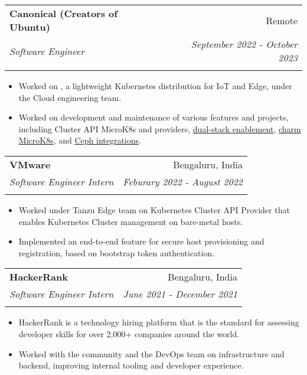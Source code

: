 \documentclass[letterpaper,10pt]{article}
\makeatletter
\newcommand{\resumeItem}[2]{
  \item\small{
    \textbf{#1}{#2 \vspace{-2pt}}
  }
}
\newcommand{\resumeSubheading}[5]{
  \vspace{4pt}\item
    \begin{tabular*}{0.97\textwidth}[t]{l@{\extracolsep{\fill}}r}
      \textbf{#1} & #2 \\
      \textit{\small#3} & \textit{\small #4} \\
      \textit{\small#5}
    \end{tabular*}\vspace{-5pt}
}
\newcommand{\resumeItemListStart}{\begin{itemize}}
\newcommand{\resumeItemListEnd}{\end{itemize}\vspace{-5pt}}
\makeatother
\begin{document}
    \resumeSubheading
    {Canonical (Creators of Ubuntu)}{Remote}
    {Software Engineer} {September 2022 - October 2023}
    {\href{https://canonical.com/}{\color{MidnightBlue}{https://canonical.com/}}}
    \resumeItemListStart
    \resumeItem{}
    {Worked on \href{https://microk8s.io/}{\color{MidnightBlue}{MicroK8s}}, a lightweight Kubernetes distribution for IoT and Edge, under the Cloud engineering team.}
    \resumeItem{}
    {Worked on development and maintenance of various features and projects, including Cluster API MicroK8s \href{https://github.com/canonical/cluster-api-control-plane-provider-microk8s/pulls?q=is\%3Apr+author\%3Asachinkumarsingh092}{\color{MidnightBlue}{control-plane}} and \href{https://github.com/canonical/cluster-api-bootstrap-provider-microk8s/pulls?q=is\%3Apr+author\%3Asachinkumarsingh092}{\color{MidnightBlue}{bootstrap}} providers, \href{https://github.com/canonical/microk8s/pulls?page=1&q=is\%3Apr+author\%3Asachinkumarsingh092}{\color{MidnightBlue}dual-stack enablement}, \href{https://github.com/canonical/charm-microk8s/pulls?q=is\%3Apr+author\%3Asachinkumarsingh092}{\color{MidnightBlue}charm MicroK8s}, and \href{https://github.com/canonical/microk8s-core-addons/pulls?q=is\%3Apr+author\%3Asachinkumarsingh092+}{\color{MidnightBlue}Ceph integrations}.}
    \resumeItemListEnd


    \resumeSubheading
    {VMware}{Bengaluru, India}
    {Software Engineer Intern} {Feburary 2022 - August 2022}
    {\href{https://www.vmware.com/}{\color{MidnightBlue}{https://www.vmware.com/}}}
    \resumeItemListStart
    \resumeItem{}
    {Worked under Tanzu Edge team on Kubernetes Cluster API Provider \href{https://github.com/vmware-tanzu/cluster-api-provider-bringyourownhost}{\color{MidnightBlue}{BYOH}} that enables Kubernetes Cluster management on bare-metal hosts.}
    \resumeItem{}
    {Implemented an end-to-end feature for secure host provisioning and registration, based on bootstrap token authentication.}
    \resumeItemListEnd


    \resumeSubheading
    {HackerRank}{Bengaluru, India}
    {Software Engineer Intern} {June 2021 - December 2021}
    {\href{https://www.hackerrank.com/}{\color{MidnightBlue}{https://www.hackerrank.com/}}}
    \resumeItemListStart
    \resumeItem{}
    {HackerRank is a technology hiring platform that is the standard for assessing developer skills for over 2,000+ companies around the world.}
    \resumeItem{}
    {Worked with the community and the DevOps team on infrastructure and backend, improving internal tooling and developer experience.}
    \resumeItemListEnd
\end{document}
